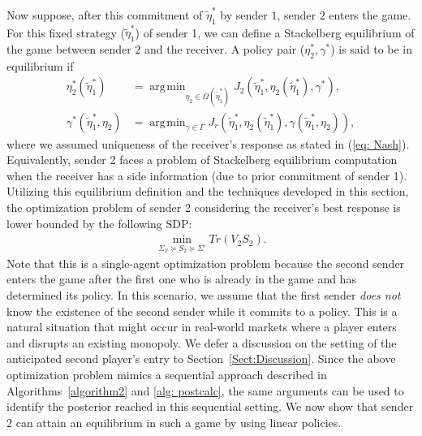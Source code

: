 \documentclass[12pt,journal,onecolumn]{IEEEtran}
\DeclareMathOperator*{\argmin}{\arg\!\min}
\begin{document}
Now suppose, after this commitment of $\tilde{\eta}_1^*$ by sender $1$, sender $2$ enters the game. For this fixed strategy ($\tilde{\eta}_1^*$) of sender 1, we can define a Stackelberg equilibrium of the game between sender $2$ and the receiver. A policy pair ($\eta_2^*,\gamma^*$) is said to be in equilibrium if
\begin{align}\label{Eq: stack}
    \eta_2^*(\tilde{\eta}_1^*)&=\argmin_{\eta_2\in\Omega(\tilde{\eta}_1^*)}J_{2}(\tilde{\eta}_1^*,\eta_2(\tilde{\eta}_1^*),\gamma^*),\\
    \gamma^*(\tilde{\eta}_1^*,\eta_2)&=\argmin_{\gamma\in\Gamma} J_r(\tilde{\eta}_1^*,\eta_2(\tilde{\eta}_1^*),\gamma(\tilde{\eta}_1^*,\eta_2)),\label{Eq: stack_2}
\end{align}
where we assumed uniqueness of the receiver's response as stated in (\ref{eq: Nash}). Equivalently, sender 2 faces a problem of Stackelberg equilibrium computation when the receiver has a side information (due to prior commitment of sender 1). Utilizing this equilibrium definition and the techniques developed in this section, the optimization problem of sender 2 considering the receiver's best response is lower bounded by the following SDP:
\begin{align*}
    \min_{\Sigma_x\succeq S_2\succeq\Sigma'}Tr(V_2S_2).
\end{align*}
Note that this is a single-agent optimization problem because the second sender enters the game after the first one who is already in the game and has determined its policy. In this scenario, we assume that the first sender \textit{does not} know the existence of the second sender while it commits to a policy. This is a natural situation that might occur in real-world markets where a player enters and disrupts an existing monopoly. We defer a discussion on the setting of the anticipated second player's entry to Section~\ref{Sect:Discussion}. Since the above optimization problem mimics a sequential approach described in Algorithms~\ref{algorithm2} and \ref{alg: postcalc}, the same arguments can be used to identify the posterior reached in this sequential setting. %
We now show that sender 2 can attain an equilibrium in such a game by using linear policies.
\end{document}
